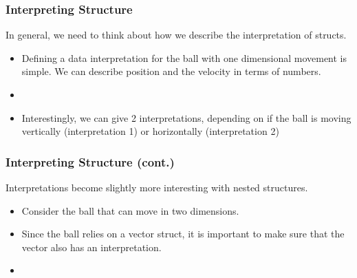 \documentclass{beamer}
\begin{document}

\begin{frame}
  \frametitle{Interpreting Structure}
  In general, we need to think about how we describe the
  interpretation of structs.
  \begin{itemize}
  \item<2-> Defining a data interpretation for the ball with one dimensional  movement is simple. We can describe position and the
    velocity in terms of numbers.
  \item<3-> \BallInterp
  \item<4-> Interestingly, we can give 2 interpretations, depending
    on if the ball is moving vertically (interpretation 1) or
    horizontally (interpretation 2)
  \end{itemize}
\end{frame}


\begin{frame}
  \frametitle{Interpreting Structure (cont.)}
  Interpretations become slightly more interesting with nested
  structures.
  \begin{itemize}
  \item<2-> Consider the ball that can move in two dimensions.
  \item<3-> Since the ball relies on a vector struct, it is important
    to make sure that the vector also has an interpretation.
  \item<4-> \NestedInterp
  \end{itemize}
\end{frame}
\end{document}
